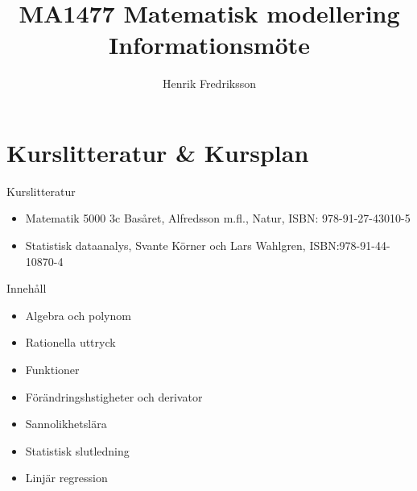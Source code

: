 \documentclass{beamer}
\author{Henrik Fredriksson}
\institute{Blekinge Tekniska Högskola}
\title{MA1477 Matematisk modellering \\ Informationsmöte}
\begin{document}
\maketitle
\begin{frame}
  \tableofcontents
\end{frame}

\section{Kurslitteratur \& Kursplan}

\begin{frame}{Kurslitteratur}
  \begin{itemize}
  \item Matematik 5000 3c Basåret, Alfredsson m.fl., Natur, ISBN: 978-91-27-43010-5
  \item Statistisk dataanalys, Svante Körner och Lars Wahlgren, ISBN:978-91-44-10870-4
  \end{itemize}
\end{frame}


\begin{frame}{Innehåll}
  \begin{itemize}

\item Algebra och polynom
\item Rationella uttryck
\item Funktioner
\item Förändringshstigheter och derivator
\item Sannolikhetslära
\item Statistisk slutledning
\item Linjär regression
  \end{itemize}
\end{frame}
\end{document}
